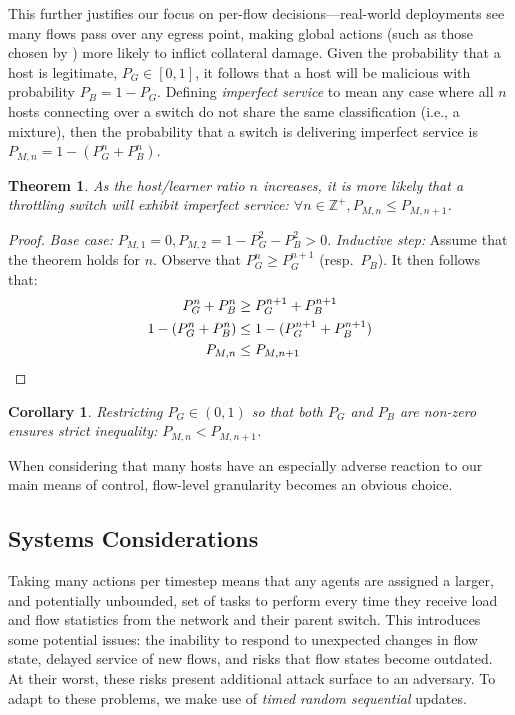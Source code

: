 \documentclass[10pt, times, comsoc]{IEEEtran}
\newtheorem{thm}{Theorem}
\newtheorem{corr}{Corollary}[thm]
\begin{document}
This further justifies our focus on per-flow decisions---real-world deployments see many flows pass over any egress point, making global actions (such as those chosen by \textcite{DBLP:journals/eaai/MalialisK15}) more likely to inflict collateral damage.
Given the probability that a host is legitimate, $P_G \in [0,1]$, it follows that a host will be malicious with probability $P_B = 1 - P_G$.
Defining \emph{imperfect service} to mean any case where all $n$ hosts connecting over a switch do not share the same classification (i.e., a mixture), then the probability that a switch is delivering imperfect service is $P_{M,n} = 1 - (P_G^n + P_B^n)$.
\begin{thm}
	As the host/learner ratio $n$ increases, it is more likely that a throttling switch will exhibit imperfect service: $\forall n \in \mathbb{Z}^{+}, P_{M,n} \le P_{M,n+1}$.
\end{thm}
\begin{proof}
	\emph{Base case:} $P_{M,1}=0, P_{M,2} = 1 - P_G^2 - P_B^2 > 0$.
	\emph{Inductive step:} Assume that the theorem holds for $n$. Observe that $P_G^n \ge P_G^{n+1}$ (resp.\ $P_B$). It then follows that:
	\begin{align*}
	P_G^n + P_B^n &\ge P_G^{n+1} + P_B^{n+1}\\
	1 - (P_G^n + P_B^n) &\le 1 - (P_G^{n+1} + P_B^{n+1})\\
	P_{M,n} &\le P_{M,n+1} \qedhere
	\end{align*}
\end{proof}
\begin{corr}
	Restricting $P_G \in (0,1)$ so that both $P_G$ and $P_B$ are non-zero ensures strict inequality: $P_{M,n} < P_{M,n+1}$.
\end{corr}
When considering that many hosts have an especially adverse reaction to our main means of control, flow-level granularity becomes an obvious choice.

\subsection{Systems Considerations}\label{sec:systems-considerations}
Taking many actions per timestep means that any agents are assigned a larger, and potentially unbounded, set of tasks to perform every time they receive load and flow statistics from the network and their parent switch.
This introduces some potential issues: the inability to respond to unexpected changes in flow state, delayed service of new flows, and risks that flow states become outdated.
At their worst, these risks present additional attack surface to an adversary.
To adapt to these problems, we make use of \emph{timed random sequential} updates.
\end{document}
